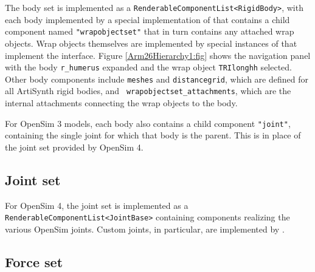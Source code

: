 The body set is implemented as a {\tt RenderableComponentList<RigidBody>}, with
each body implemented by a special implementation of
 that contains a
child component named {\tt "wrapobjectset"} that in turn contains any attached
wrap objects.  Wrap objects themselves are implemented by special instances
of  that implement the
 interface.  Figure \ref{Arm26Hierarchy1:fig}
shows the navigation panel with the body {\tt r\_humerus} expanded and the wrap
object {\tt TRIlonghh} selected. Other body components include {\tt meshes} and
{\tt distancegrid}, which are defined for all ArtiSynth rigid bodies, and {\tt
wrapobjectset\_attachments}, which are the internal attachments connecting the
wrap objects to the body.

For OpenSim 3 models, each body also contains a child component {\tt "joint"},
containing the single joint for which that body is the parent. This is in place
of the joint set provided by OpenSim 4.

\subsection{Joint set}

For OpenSim 4, the joint set is implemented as a {\tt
RenderableComponentList<JointBase>} containing 
components realizing the various OpenSim joints. Custom joints, in particular,
are implemented by .

\subsection{Force set}

